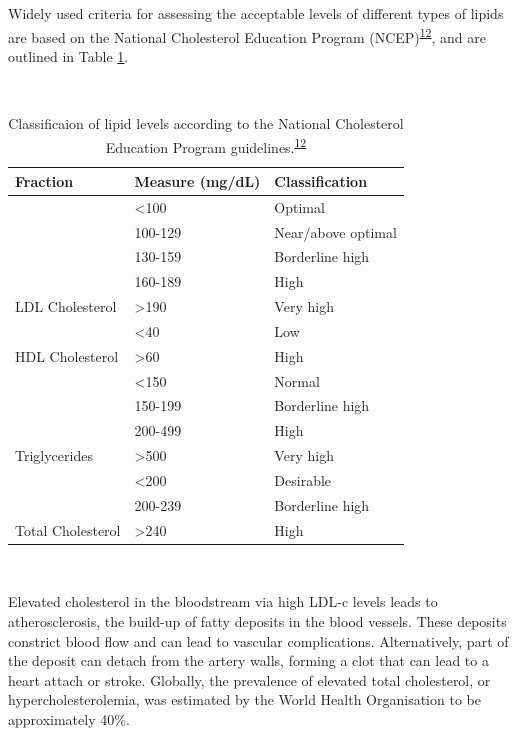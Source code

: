 \documentclass[a4paper, twoside]{templates/ociamthesis}
\begin{document}
Widely used criteria for assessing the acceptable levels of different types of lipids are based on the National Cholesterol Education Program (NCEP)\textsuperscript{\protect\hyperlink{ref-national2002third}{12}}, and are outlined in Table \ref{tab:lipidLevels-table}.

~



\begin{table}[!h]

\caption{\label{tab:lipidLevels-table}Classificaion of lipid levels according to the National Cholesterol Education Program guidelines.\textsuperscript{\protect\hyperlink{ref-national2002third}{12}}}
\centering
\begin{tabular}[t]{lll}
\toprule
\textbf{Fraction} & \textbf{Measure (mg/dL)} & \textbf{Classification}\\
\midrule
 & <100 & Optimal\\
\cmidrule{2-3}
 & 100-129 & Near/above optimal\\
\cmidrule{2-3}
 & 130-159 & Borderline high\\
\cmidrule{2-3}
 & 160-189 & High\\
\cmidrule{2-3}
\multirow{-5}{*}{\raggedright\arraybackslash LDL Cholesterol} & >190 & Very high\\
\cmidrule{1-3}
 & <40 & Low\\
\cmidrule{2-3}
\multirow{-2}{*}{\raggedright\arraybackslash HDL Cholesterol} & >60 & High\\
\cmidrule{1-3}
 & <150 & Normal\\
\cmidrule{2-3}
 & 150-199 & Borderline high\\
\cmidrule{2-3}
 & 200-499 & High\\
\cmidrule{2-3}
\multirow{-4}{*}{\raggedright\arraybackslash Triglycerides} & >500 & Very high\\
\cmidrule{1-3}
 & <200 & Desirable\\
\cmidrule{2-3}
 & 200-239 & Borderline high\\
\cmidrule{2-3}
\multirow{-3}{*}{\raggedright\arraybackslash Total Cholesterol} & >240 & High\\
\bottomrule
\end{tabular}
\end{table}

~

Elevated cholesterol in the bloodstream via high LDL-c levels leads to atherosclerosis, the build-up of fatty deposits in the blood vessels. These deposits constrict blood flow and can lead to vascular complications. Alternatively, part of the deposit can detach from the artery walls, forming a clot that can lead to a heart attach or stroke. Globally, the prevalence of elevated total cholesterol, or hypercholesterolemia, was estimated by the World Health Organisation to be approximately 40\%.
\end{document}
